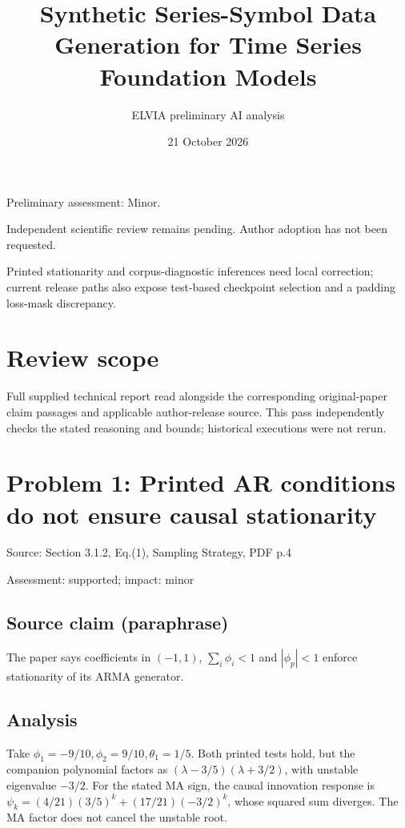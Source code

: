 \documentclass[11pt]{article}
\begin{document}
\title{Synthetic Series-Symbol Data Generation for Time Series Foundation Models}

\author{ELVIA preliminary AI analysis}\date{21 October 2026}\maketitle

Preliminary assessment: Minor.\par

Independent scientific review remains pending. Author adoption has not been requested.

Printed stationarity and corpus-diagnostic inferences need local correction; current release paths also expose test-based checkpoint selection and a padding loss-mask discrepancy.

\section*{Review scope}

Full supplied technical report read alongside the corresponding original-paper claim passages and applicable author-release source. This pass independently checks the stated reasoning and bounds; historical executions were not rerun.

\section*{Problem 1: Printed AR conditions do not ensure causal stationarity}

Source: Section 3.1.2, Eq.(1), Sampling Strategy, PDF p.4

Assessment: supported; impact: minor

\subsection*{Source claim (paraphrase)}

The paper says coefficients in \((-1,1)\), \(\sum_i\phi_i<1\) and \(|\phi_p|<1\) enforce stationarity of its ARMA generator.

\subsection*{Analysis}

Take \(\phi_1=-9/10,\phi_2=9/10,\theta_1=1/5\). Both printed tests hold, but the companion polynomial factors as \((\lambda-3/5)(\lambda+3/2)\), with unstable eigenvalue \(-3/2\). For the stated MA sign, the causal innovation response is \(\psi_k=(4/21)(3/5)^k+(17/21)(-3/2)^k\), whose squared sum diverges. The MA factor does not cancel the unstable root.
\end{document}
